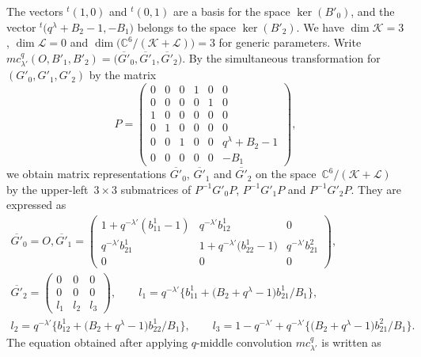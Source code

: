 \documentclass[pdftex]{sigma}
\numberwithin{equation}{section}
\theoremstyle{definition}
\begin{document}
The vectors ${}^t(1, 0)$ and ${}^t(0, 1)$ are a basis for the space $\ker (B'_0)$, and the vector ${}^t\bigl(q^{\lambda} + B_2 - 1, -B_1\bigr)$ belongs to the space $\ker (B'_2)$.
We have $\dim \mathcal{K}=3$, $\dim \mathcal{L}=0$ and $\dim \bigl(\mathbb{C}^6/(\mathcal{K} + \mathcal{L}) \bigr) =3 $ for generic parameters.
Write $mc^q_{\lambda'} (O, B'_1, B'_2) = \bigl(\overline{G'}_0, \overline{G'}_1, \overline{G'}_2\bigr)$.
By the simultaneous transformation for $(G'_0, G'_1, G'_2)$ by the matrix
\begin{equation*}
P = \begin{pmatrix}
 0 & 0 & 0 & 1 & 0 & 0 \\
 0 & 0 & 0 & 0 & 1 & 0 \\
 1 & 0 & 0 & 0 & 0 & 0 \\
 0 & 1 & 0 & 0 & 0 & 0 \\
 0 & 0 & 1 & 0 & 0 & q^{\lambda} + B_2 - 1 \\
 0 & 0 & 0 & 0 & 0 & -B_1
\end{pmatrix},
\end{equation*}
we obtain matrix representations $\overline{G'}_0$, $\overline{G'}_1$ and $\overline{G'}_2$ on the space~${\mathbb{C}^6/(\mathcal{K} + \mathcal{L}) }$ by the upper-left~${3\times 3}$ submatrices of $P^{-1}G'_0 P$, $P^{-1}G'_1 P$ and $P^{-1}G'_2 P$.
They are expressed as
\begin{gather*}
\overline{G'}_0 = O, \overline{G'}_1
= \begin{pmatrix}
 1 + q^{-\lambda'}(b^1_{11} - 1) & q^{-\lambda'}b^1_{12} & 0 \\
 q^{-\lambda'}b^1_{21} & 1 + q^{-\lambda'}\bigl(b^1_{22} - 1\bigr) & q^{-\lambda'}b^2_{21} \\
 0 & 0 & 0
 \end{pmatrix}, \\
 \overline{G'}_2
= \begin{pmatrix}
 0 & 0 & 0 \\
 0 & 0 & 0 \\
 l_1 & l_2 & l_3
 \end{pmatrix},
\qquad
l_1 = q^{-\lambda'} \bigl\{ b^1_{11} + \bigl(B_2 + q^{\lambda}-1\bigr) b^1_{21} / B_1 \bigr\} , \\
l_2 = q^{-\lambda'} \bigl\{ b^1_{12} + \bigl(B_2 + q^{\lambda}-1\bigr) b^1_{22}/B_1 \bigr\},\qquad
l_3 = 1 - q^{-\lambda'} + q^{-\lambda'} \bigl\{ \bigl(B_2 + q^{\lambda}-1\bigr) b^2_{21} /B_1 \bigr\}.
\end{gather*}
The equation obtained after applying $q$-middle convolution $mc^q_{\lambda'}$ is written as
\end{document}
